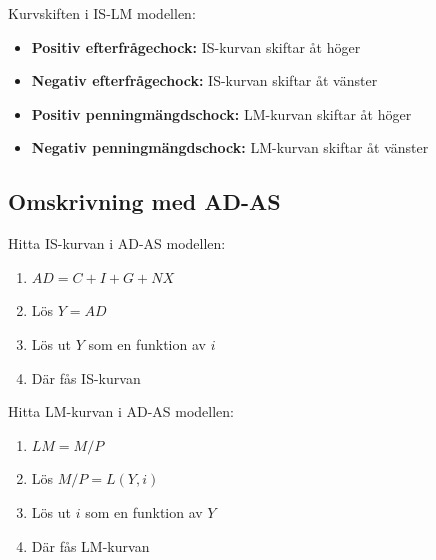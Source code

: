 \documentclass[12pt,a4paper]{article}
\begin{document}
Kurvskiften i IS-LM modellen:
\begin{itemize}
    \item \textbf{Positiv efterfrågechock: }IS-kurvan skiftar åt höger
    \item \textbf{Negativ efterfrågechock: }IS-kurvan skiftar åt vänster
    \item \textbf{Positiv penningmängdschock: }LM-kurvan skiftar åt höger
    \item \textbf{Negativ penningmängdschock: }LM-kurvan skiftar åt vänster
\end{itemize}

\subsection{Omskrivning med AD-AS}
Hitta IS-kurvan i AD-AS modellen:
\begin{enumerate}
    \item $AD = C + I + G + NX$
    \item Lös $Y = AD$
    \item Lös ut $Y$ som en funktion av $i$
    \item Där fås IS-kurvan
\end{enumerate}

Hitta LM-kurvan i AD-AS modellen:
\begin{enumerate}
    \item $LM = M/P$
    \item Lös $M/P = L(Y, i)$
    \item Lös ut $i$ som en funktion av $Y$
    \item Där fås LM-kurvan
\end{enumerate}
\end{document}
